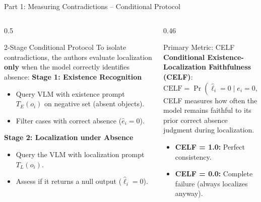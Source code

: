 \documentclass[aspectratio=169]{beamer}
\begin{document}
\begin{frame}{Part 1: Measuring Contradictions -- Conditional Protocol}
    \begin{columns}[T]
        \begin{column}{0.5\textwidth}
            \begin{block}{2-Stage Conditional Protocol}
                To isolate contradictions, the authors evaluate localization \textbf{only} when the model correctly identifies absence:
                \vskip 0.15cm
                \textbf{Stage 1: Existence Recognition}
                \begin{itemize}
                    \item Query VLM with existence prompt $T_E(o_i)$ on negative set (absent objects).
                    \item Filter cases with correct absence ($\hat{e}_i = 0$).
                \end{itemize}
                \textbf{Stage 2: Localization under Absence}
                \begin{itemize}
                    \item Query the VLM with localization prompt $T_L(o_i)$.
                    \item Assess if it returns a null output ($\hat{\ell}_i = 0$).
                \end{itemize}
            \end{block}
        \end{column}
        
        \begin{column}{0.46\textwidth}
            \begin{exampleblock}{Primary Metric: CELF}
                \textbf{Conditional Existence-Localization Faithfulness (CELF)}:
                \begin{equation*}
                    \text{CELF} = \Pr(\hat{\ell}_i = 0 \mid e_i = 0, \hat{e}_i = 0)
                \end{equation*}
                \vskip 0.1cm
                CELF measures how often the model remains faithful to its prior correct absence judgment during localization.
                \begin{itemize}
                    \item \textbf{CELF = 1.0:} Perfect consistency.
                    \item \textbf{CELF = 0.0:} Complete failure (always localizes anyway).
                \end{itemize}
            \end{exampleblock}
        \end{column}
    \end{columns}
\end{frame}
\end{document}

